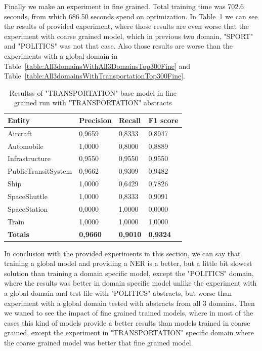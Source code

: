 \documentclass[thesis=M,english]{FITthesis}[2018/05/30]
\begin{document}
	Finally we make an experiment in fine grained. Total training time was 702.6 seconds, from which 686.50 seconds spend on optimization. In Table~\ref{table:TransportationDomainsWithTransportationTop300Fine} we can see the results of provided experiment, where those results are even worse that the experiment with coarse grained model, which in previous two domain, "SPORT" and "POLITICS" was not that case. Also those results are worse than the experiments with a global domain in Table~\ref{table:All3domainsWithAll3DomainsTop300Fine} and Table~\ref{table:All3domainsWithTransportationTop300Fine}. 
	\begin{table}[H]\centering
		\begin{tabular}{|l|l|l|l|}
			\hline {\textbf{Entity}} & {\textbf{Precision}} & {\textbf{Recall}} & {\textbf{F1 score}}\\\hline
				Aircraft & 0,9659 & 0,8333 & 0,8947\\
				Automobile & 1,0000 & 0,8000 & 0,8889\\				
				Infrastructure & 0,9550 & 0,9550 & 0,9550\\
				PublicTransitSystem & 0,9662 & 0,9309 & 0,9482\\
				Ship & 1,0000 & 0,6429 & 0,7826\\				
				SpaceShuttle & 1,0000 & 0,8333 & 0,9091\\
				SpaceStation & 0,0000 & 1,0000 & 0,0000\\
				Train & 1,0000 & 1,0000 & 1,0000\\\hline
				\textbf{Totals} & \textbf{0,9660} & \textbf{0,9010} & \textbf{0,9324}\\\hline
		\end{tabular}
		\caption{Resultss of "TRANSPORTATION" base model in fine grained run with "TRANSPORTATION" abstracts \label{table:TransportationDomainsWithTransportationTop300Fine}}
	\end{table}	

	In conclusion with the provided experiments in this section, we can say that training a global model and providing a NER is a better, but a little bit slowest solution than training a domain specific model, except the "POLITICS" domain, where the results was better in domain specific model unlike the experiment with a global domain and test file with "POLITICS" abstracts, but worse than experiment with a global domain tested with abstracts from all 3 domains. Then we waned to see the impact of fine grained trained models, where in most of the cases this kind of models provide a better results than models trained in coarse grained, except the experiment in "TRANSPORTATION" specific domain where the coarse grained model was better that fine grained model.
	
\end{document}
